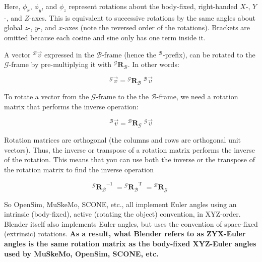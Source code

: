 \documentclass{article}
\begin{document}
Here, \( \phi_x \), \( \phi_y \), and \( \phi_z \) represent rotations about the body-fixed, right-handed \( X \)-, \( Y \)-, and \( Z \)-axes. This is equivalent to successive rotations by the same angles about global \( z \)-, \( y \)-, and \( x \)-axes (note the reversed order of the rotations). Brackets are omitted because each cosine and sine only has one term inside it.

A vector \( {}^{\mathcal{B}}\vec{v} \) expressed in the \( \mathcal{B} \)-frame (hence the \( {}^\mathcal{B} \)-prefix), can be rotated to the \( \mathcal{G} \)-frame by pre-multiplying it with \( {}^{\mathcal{G}} \mathbf{R}_{\mathcal{B}} \). In other words:

\begin{equation}
{}^{\mathcal{G}}\vec{v} = {}^{\mathcal{G}} \mathbf{R}_{\mathcal{B}} \; { }^{\mathcal{B}}\vec{v}
\end{equation}



To rotate a vector from the \( \mathcal{G} \)-frame to the the \( \mathcal{B} \)-frame, we need a rotation matrix that performs the inverse operation:

\begin{equation}
    {}^{\mathcal{B}}\vec{v} = {}^{\mathcal{B}} \mathbf{R}_{\mathcal{G}} \; { }^{\mathcal{G}}\vec{v}
\end{equation}

Rotation matrices are orthogonal (the columns and rows are orthogonal unit vectors). Thus, the inverse or transpose of a rotation matrix performs the inverse of the rotation. This means that you can use both the inverse or the transpose of the rotation matrix to find the inverse operation

\begin{equation}
    {{}^{\mathcal{G}} \mathbf{R}_{\mathcal{B}}}^{-1} \; = {{}^{\mathcal{G}} \mathbf{R}_{\mathcal{B}}}^\mathrm{T} \;  = {{}^{\mathcal{B}} \mathbf{R}_{\mathcal{G}}} \;   
    \label{sec:inversermatrix}    
\end{equation}


So OpenSim, MuSkeMo, SCONE, etc., all implement Euler angles using an intrinsic (body-fixed), active (rotating the object) convention, in XYZ-order. Blender itself also implements Euler angles, but uses the convention of space-fixed (extrinsic) rotations. \textbf{As a result, what Blender refers to as ZYX-Euler angles is the same rotation matrix as the body-fixed XYZ-Euler angles used by MuSkeMo, OpenSim, SCONE, etc.}
\end{document}
